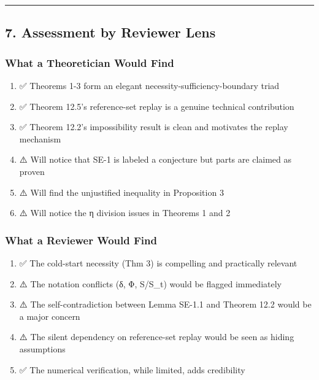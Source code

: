 \documentclass[
  12pt,
]{ctexart}
\providecommand{\tightlist}{%
  \setlength{\itemsep}{0pt}\setlength{\parskip}{0pt}}
\begin{document}
\begin{center}\rule{0.5\linewidth}{0.5pt}\end{center}

\subsection{7. Assessment by Reviewer
Lens}\label{assessment-by-reviewer-lens}

\subsubsection{What a Theoretician Would
Find}\label{what-a-theoretician-would-find}

\begin{enumerate}
\def\labelenumi{\arabic{enumi}.}
\tightlist
\item
  ✅ Theorems 1-3 form an elegant necessity-sufficiency-boundary triad
\item
  ✅ Theorem 12.5's reference-set replay is a genuine technical
  contribution
\item
  ✅ Theorem 12.2's impossibility result is clean and motivates the
  replay mechanism
\item
  ⚠️ Will notice that SE-1 is labeled a conjecture but parts are claimed
  as proven
\item
  ⚠️ Will find the unjustified inequality in Proposition 3
\item
  ⚠️ Will notice the η division issues in Theorems 1 and 2
\end{enumerate}

\subsubsection{What a Reviewer Would
Find}\label{what-a-reviewer-would-find}

\begin{enumerate}
\def\labelenumi{\arabic{enumi}.}
\tightlist
\item
  ✅ The cold-start necessity (Thm 3) is compelling and practically
  relevant
\item
  ⚠️ The notation conflicts (δ, Φ, S/S\_t) would be flagged immediately
\item
  ⚠️ The self-contradiction between Lemma SE-1.1 and Theorem 12.2 would
  be a major concern
\item
  ⚠️ The silent dependency on reference-set replay would be seen as
  hiding assumptions
\item
  ✅ The numerical verification, while limited, adds credibility
\end{enumerate}
\end{document}
